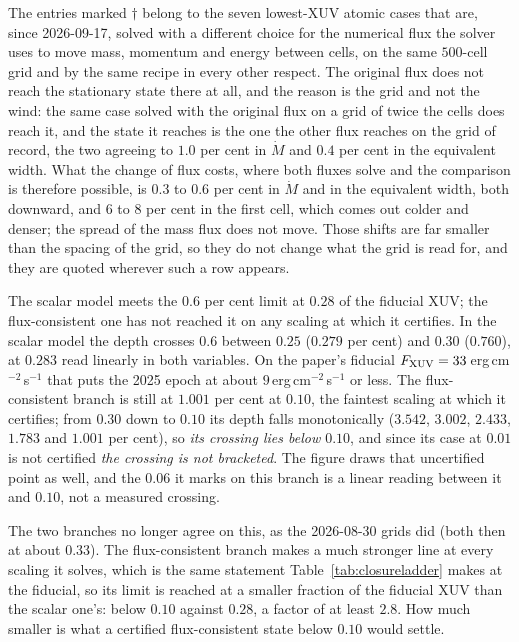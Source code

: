 \documentclass[english,a4paper]{my_memo}
\begin{document}
\noindent The entries marked $\dagger$ belong to the seven lowest-XUV atomic
cases that are, since 2026-09-17, solved with a different choice for the
numerical flux the solver uses to move mass,
momentum and energy between cells, on the same $500$-cell grid and by the
same recipe in every other respect. The original flux does not reach the
stationary state there at all, and the reason is the grid and not the wind:
the same case solved with the original flux on a grid of twice the cells does
reach it, and the state it reaches is the one the other flux reaches on the
grid of record, the two agreeing to $1.0$ per cent in $\dot M$ and $0.4$ per
cent in the equivalent width. What the change of flux costs, where both
fluxes solve and the comparison is therefore possible, is $0.3$ to $0.6$ per
cent in $\dot M$ and in the equivalent width, both downward, and $6$ to $8$
per cent in the first cell, which comes out colder and denser; the spread of
the mass flux does not move. Those shifts are far smaller than the spacing of
the grid, so they do not change what the grid is read for, and they are
quoted wherever such a row appears.

\noindent The scalar model meets the $0.6$ per cent limit at $0.28$ of the
fiducial XUV; the flux-consistent one has not reached it on any scaling at
which it certifies. In the scalar model the depth crosses $0.6$ between $0.25$
($0.279$ per cent) and $0.30$ ($0.760$), at $0.283$ read linearly in both
variables. On the paper's fiducial
$F_{\rm XUV} = 33$\,erg\,cm$^{-2}$\,s$^{-1}$ that puts the 2025 epoch at
about $9$\,erg\,cm$^{-2}$\,s$^{-1}$ or less. The flux-consistent branch is
still at $1.001$ per cent at $0.10$, the faintest scaling at which it
certifies; from $0.30$ down to $0.10$ its depth falls monotonically ($3.542$,
$3.002$, $2.433$, $1.783$ and $1.001$ per cent), so \emph{its crossing lies
below $0.10$}, and since its case at $0.01$ is not certified \emph{the
crossing is not bracketed}. The figure draws that uncertified point as well,
and the $0.06$ it marks on this branch is a linear reading between it and
$0.10$, not a measured crossing.

The two branches no longer agree on this, as the 2026-08-30 grids did (both
then at about $0.33$). The flux-consistent branch makes a much stronger line
at every scaling it solves, which is the same statement
Table~\ref{tab:closureladder} makes at the fiducial, so its limit is reached
at a smaller fraction of the fiducial XUV than the scalar one's: below $0.10$
against $0.28$, a factor of at least $2.8$. How much smaller is what a
certified flux-consistent state below $0.10$ would settle.
\end{document}
